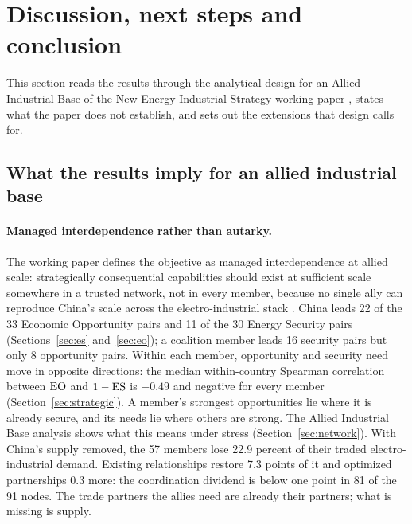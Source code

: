 \section{Discussion, next steps and conclusion}\label{sec:discussion}

This section reads the results through the analytical design for an Allied Industrial Base of
the New Energy Industrial Strategy working paper \citep{neis2026allied}, states what the paper does
not establish, and sets out the extensions that design calls for.

\subsection{What the results imply for an allied industrial base}\label{subsec:discussion_implications}

\paragraph{Managed interdependence rather than autarky.} The working paper defines the objective
as managed interdependence at allied scale: strategically consequential capabilities should exist
at sufficient scale somewhere in a trusted network, not in every member, because no single ally
can reproduce China's scale across the electro-industrial stack
\citep{neis2026allied,campbell2025underestimating}. China leads 22 of the 33 Economic Opportunity pairs and 11
of the 30 Energy Security pairs (Sections~\ref{sec:es} and~\ref{sec:eo}); a coalition member leads
16 security pairs but only 8 opportunity pairs. Within each member, opportunity and security need
move in opposite directions: the median within-country Spearman correlation between $\mathrm{EO}$ and
$1-\mathrm{ES}$ is $-0.49$ and negative for every member (Section~\ref{sec:strategic}). A member's strongest
opportunities lie where it is already secure, and its needs lie where others are strong. The
Allied Industrial Base analysis shows what this means under stress (Section~\ref{sec:network}). With
China's supply removed, the 57 members lose 22.9 percent of their traded electro-industrial demand.
Existing relationships restore 7.3 points of it and optimized partnerships 0.3 more: the coordination
dividend is below one point in 81 of the 91 nodes. The trade partners the allies need are already
their partners; what is missing is supply.

